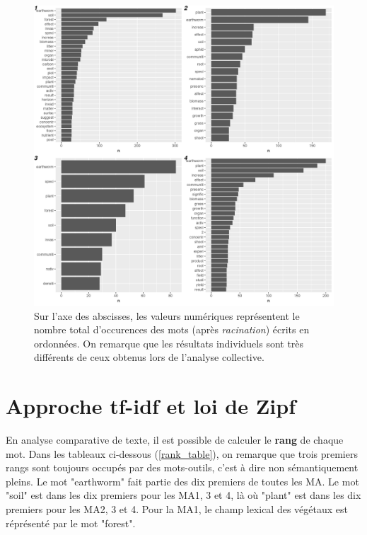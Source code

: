 \documentclass{book}
\begin{document}
\begin{figure} %
    \begin{center} %
        \includegraphics[width=1\textwidth]{freq_each_MA.png}
        \caption{Sur l'axe des abscisses, les valeurs numériques représentent le nombre total d'occurences des mots (après \textit{racination}) écrits en ordonnées. On remarque que les résultats individuels sont très différents de ceux obtenus lors de l'analyse collective.\label{freq_each}}
    \end{center}  
\end{figure}

\clearpage

\section{Approche tf-idf et loi de Zipf}
\noindent
 En analyse comparative de texte, il est possible de calculer le \textbf{rang} de chaque mot. Dans les tableaux ci-dessous (\cref{rank_table}), on remarque que trois premiers rangs sont toujours occupés par des mots-outils, c'est à dire non sémantiquement pleins. Le mot "earthworm" fait partie des dix premiers de toutes les MA. Le mot "soil" est dans les dix premiers pour les MA1, 3 et 4, là où "plant" est dans les dix premiers pour les MA2, 3 et 4. Pour la MA1, le champ lexical des végétaux est réprésenté par le mot "forest".
\end{document}
